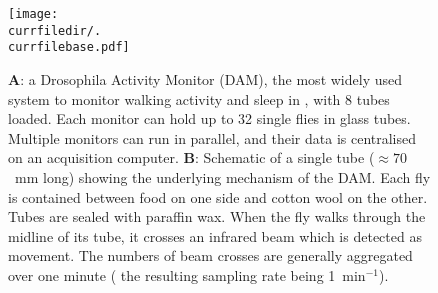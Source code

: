 \begin{figure}[h!]
	\texttt{[image: \\currfiledir/.\\currfilebase.pdf]}

	\caption[Drosophila Activity Monitor]{
		\textbf{A}: a Drosophila Activity Monitor (DAM), the most widely used system to monitor walking activity and sleep in \droso, with 8 tubes loaded.
		Each monitor can hold up to 32 single flies in glass tubes.
		Multiple monitors can run in parallel, and their data is centralised on an acquisition computer.
		\textbf{B}: Schematic of a single tube ($\approx 70$~mm long) showing the underlying mechanism of the DAM.
		Each fly is contained between food on one side and cotton wool on the other. 
		Tubes are sealed with paraffin wax.
		When the fly walks through the midline of its tube, it crosses an infrared beam which is detected as movement.
		The numbers of beam crosses are generally aggregated over one minute (\ie{} the resulting sampling rate being 1~min$^{-1}$).
		\label{fig:\currfilebase}
	}
\end{figure}

